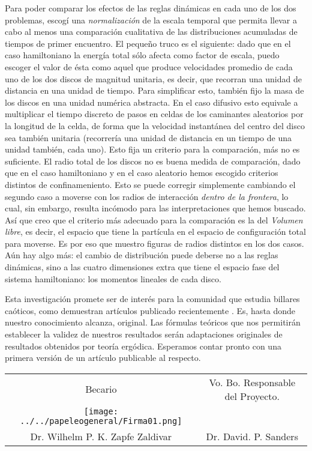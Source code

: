 \documentclass[letterpaper, 11pt]{article}
\begin{document}
Para poder comparar los efectos de las reglas dinámicas en cada uno
de los dos problemas, escogí una \emph{normalización} de la escala
temporal que permita llevar a cabo al menos una comparación cualitativa
de las distribuciones acumuladas de tiempos de primer encuentro. 
El pequeño truco es el siguiente: dado que en el caso hamiltoniano
la energía total sólo afecta como factor de escala, puedo escoger
el valor de ésta como aquel que produce velocidades promedio
de cada uno de los dos discos de magnitud unitaria, es decir,
que recorran una unidad de distancia en una unidad de tiempo. 
Para simplificar esto, también fijo la masa de los discos en 
una unidad numérica abstracta. En el caso difusivo esto equivale
a multiplicar el tiempo discreto de pasos en celdas de los
caminantes aleatorios por la longitud de la celda, de forma
que la velocidad instantánea del centro del disco sea
también unitaria (recorrería una unidad de distancia en un
tiempo de una unidad también, cada uno). Esto fija un criterio
para la comparación, más no es suficiente. El radio total de
los discos no es buena medida de comparación, dado que en el caso
hamiltoniano y en el caso aleatorio hemos escogido
criterios distintos de confinameniento. Esto se puede corregir
simplemente cambiando el segundo caso a moverse con los radios
de interacción \emph{dentro de la frontera}, lo cual,
sin embargo, resulta incómodo para las interpretaciones que hemos
buscado. Así que creo que el criterio más adecuado para la comparación
es la del \emph{Volumen libre}, es decir, el espacio
que tiene la partícula en el espacio de configuración total 
para moverse. Es por eso que muestro figuras de radios distintos
en los dos casos.
Aún hay algo más: el cambio de distribución
puede deberse no a las reglas dinámicas, sino a las cuatro
dimensiones extra que tiene el espacio fase del sistema
hamiltoniano: los momentos lineales de cada disco.  

Esta investigación promete ser de interés para la 
comunidad que estudia billares caóticos,
como demuestran artículos publicado recientemente \cite{Munakata02}.
Es, hasta donde nuestro conocimiento alcanza, original. Las fórmulas teóricos
que nos permitirán establecer la validez de nuestros resultados serán
adaptaciones originales de resultados obtenidos por teoría ergódica. 
Esperamos contar pronto 
con una primera versión de un artículo publicable al respecto.

\vfill

\begin{tabular}{cc}
Becario &  Vo. Bo. Responsable del Proyecto.\\
\texttt{[image: ../../papeleogeneral/Firma01.png]} &  \\
Dr. Wilhelm P. K. Zapfe Zaldivar  & Dr. David. P. Sanders
\end{tabular}


\newpage

\end{document}
